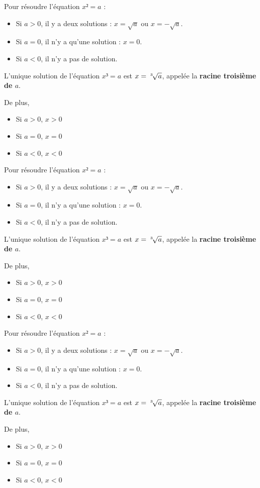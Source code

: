 \documentclass[noheader]{coursclass}
\begin{document}
\newcommand{\Proprietes}{
	\begin{propriete}
		Pour résoudre l'équation $x² = a$ :
		\begin{itemize}
			\item Si $a > 0$, il y a deux solutions : $x = \sqrt{a}$ ou $x = -\sqrt{a}$.
			\item Si $a = 0$, il n'y a qu'une solution : $x = 0$.
			\item Si $a < 0$, il n'y a pas de solution.
		\end{itemize}
	\end{propriete}

	\begin{propriete}
		L'unique solution de l'équation $x³ = a$ est $x = \sqrt[3\hspace{0.5em}]{a}$, appelée la \textbf{racine troisième de $a$}.

		De plus,
		\begin{itemize}
			\item Si $a > 0$, $x > 0$
			\item Si $a = 0$, $x = 0$
			\item Si $a < 0$, $x < 0$
		\end{itemize}
	\end{propriete}
	\vspace{1em}
}

\Proprietes

\Proprietes

\Proprietes
\end{document}
